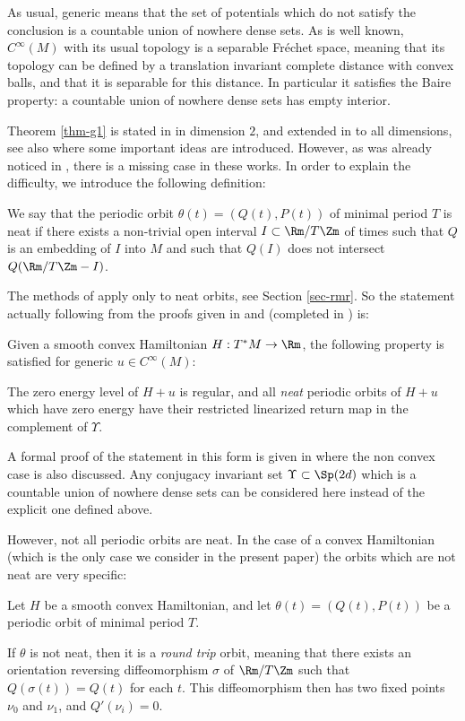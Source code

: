 As usual, generic means that the set of potentials which do not satisfy the conclusion is a countable union of nowhere dense sets. As is well known, $C^{\infty}(M)$ with its usual topology is a separable Fréchet space,
meaning that its topology can be defined by a translation invariant complete distance with convex balls, and that it is separable for this distance. In particular it satisfies the Baire property: a countable union of nowhere dense sets has empty interior.

Theorem \ref{thm-g1} is stated in \cite{O08} in dimension $2$, and extended in \cite{RR} to all dimensions, see also \cite{Co10}
where some important ideas are introduced. However, as was already noticed in \cite{AB2},
there is a missing case in these works.
In order to explain the difficulty, we introduce the following definition:

We say that the periodic orbit $\theta(t)=(Q(t), P(t))$ of minimal period $T$ is neat if there exists a non-trivial open interval $I\subset \Rm/T\Zm$ of times such that $Q$ is an embedding of $I$ into $M$ and such that
$Q(I)$ does not intersect $Q(\Rm/T\Zm-I)$.

The methods of \cite{O08,RR} apply only to neat orbits, see Section \ref{sec-rmr}. So the statement actually following from the proofs given in \cite{O08} and \cite{RR}
(completed in \cite{AB}) is:

\begin{thm}\label{thm-g2}
Given a smooth convex Hamiltonian $H: T^*M\rightarrow \Rm$,
the following property is satisfied for generic $u\in C^{\infty}(M)$:

The zero energy level of $H+u$ is regular, and all \emph{neat}
periodic orbits of $H+u$ which have zero energy have their restricted linearized
return map in the complement of $\Upsilon$.
\end{thm}

A formal proof of the statement in this form is given in \cite{AB2} where the non convex case is also discussed. Any
conjugacy invariant set $\Upsilon\subset \Sp(2d)$ which is a countable union of nowhere dense sets can be considered here instead of the explicit one defined above.

However, not all periodic orbits are neat.
In the case of a convex Hamiltonian (which is the only case we consider in the present paper) the orbits which are not neat are very specific:

\begin{prop}\label{prop-neat}
Let $H$ be a smooth convex Hamiltonian, and let $\theta(t)=(Q(t),P(t))$ be a periodic orbit of minimal period $T$.

If $\theta$ is not neat, then it is a \textit{round trip} orbit, meaning that
there exists an orientation reversing diffeomorphism $\sigma$ of $\Rm/T\Zm$ such that $Q(\sigma(t))=Q(t)$ for each $t$. This diffeomorphism then has two fixed points $\nu_0$ and $\nu_1$, and $Q'(\nu_i)=0$.
\end{prop}

